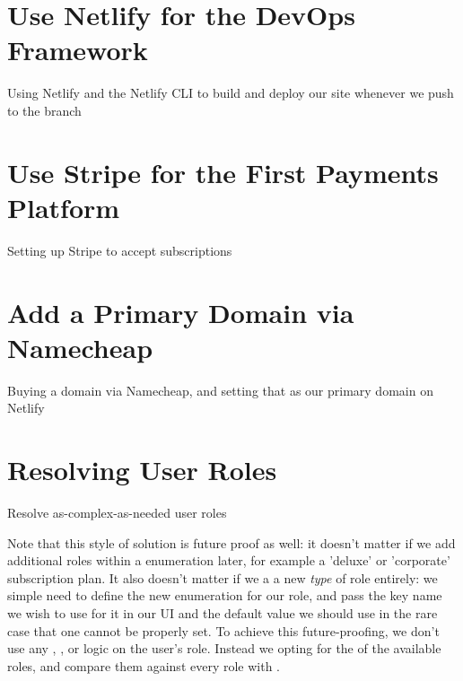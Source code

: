 \documentclass[a4paper,
                             oneside,
                             BCOR1.0cm,
                             DIV11,
                             parskip=full,
                             11pt]{scrbook}
\begin{document}
\section{Use Netlify for the DevOps Framework}\label{sec:titles}
\begin{arrows}
\item Using Netlify and the Netlify CLI to build and deploy our site whenever we push to the  branch
\end{arrows}

\section{Use Stripe for the First Payments Platform}\label{sec:titles}
\begin{arrows}
\item Setting up Stripe to accept subscriptions
\end{arrows}

\section{Add a Primary Domain via Namecheap}\label{sec:titles}
\begin{arrows}
\item Buying a domain via Namecheap, and setting that as our primary domain on Netlify
\end{arrows}

\section{Resolving User Roles}\label{sec:titles}
\begin{arrows}
\item Resolve as-complex-as-needed user roles
\end{arrows}

Note that this style of solution is future proof as well: it doesn't matter if we add additional roles within a enumeration later, for example a 'deluxe' or 'corporate' subscription plan. It also doesn't matter if we a a new \textit{type} of role entirely: we simple need to define the new enumeration for our role, and pass the key name we wish to use for it in our UI and the default value we should use in the rare case that one cannot be properly set. To achieve this future-proofing, we don't use any , , or  logic on the user's role. Instead we opting for the  of the available roles, and compare them against every role with .
\end{document}

